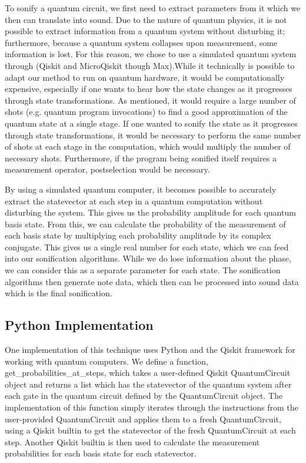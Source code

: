 \documentclass[10pt,twocolumn]{article}
\begin{document}
To sonify a quantum circuit, we first need to extract parameters from it which we then can translate into sound. Due to the nature of quantum physics, it is not possible to extract information from a quantum system without disturbing it; furthermore, because a quantum system collapses upon measurement, some information is lost. For this reason, we chose to use a simulated quantum system through (Qiskit\cite{qiskit} and MicroQiskit\cite{microqiskit} though Max\cite{maxmsp}).While it technically is possible to adapt our method to run on quantum hardware, it would be computationally expensive, especially if one wants to hear how the state changes as it progresses through state transformations. As mentioned, it would require a large number of shots (e.g. quantum program invocations) to find a good approximation of the quantum state at a single stage\cite{qiskitalgos}. If one wanted to sonify the state as it progresses through state transformations, it would be necessary to perform the same number of shots at each stage in the computation, which would multiply the number of necessary shots. Furthermore, if the program being sonified itself requires a measurement operator, postselection would be necessary.

By using a simulated quantum computer, it becomes possible to accurately extract the statevector at each step in a quantum computation without disturbing the system\cite{qiskitstatevectordocs}. This gives us the probability amplitude for each quantum basis state. From this, we can calculate the probability of the measurement of each basis state by multiplying each probability amplitude by its complex conjugate. This gives us a single real number for each state, which we can feed into our sonification algorithms. While we do lose information about the phase, we can consider this as a separate parameter for each state. The sonification algorithms then generate note data, which then can be processed into sound data which is the final sonification.

\subsection{Python Implementation}

One implementation of this technique uses Python\cite{pythonlang} and the Qiskit\cite{qiskit} framework for working with quantum computers. We define a function, get\_probabilities\_at\_steps, which takes a user-defined Qiskit QuantumCircuit object and returns a list which has the statevector of the quantum system after each gate in the quantum circuit defined by the QuantumCircuit object. The implementation of this function simply iterates through the instructions from the user-provided QuantumCircuit and applies them to a fresh QuantumCircuit, using a Qiskit builtin to get the statevector of the fresh QuantumCircuit at each step. Another Qiskit builtin is then used to calculate the measurement probabilities for each basis state for each statevector.
\end{document}
